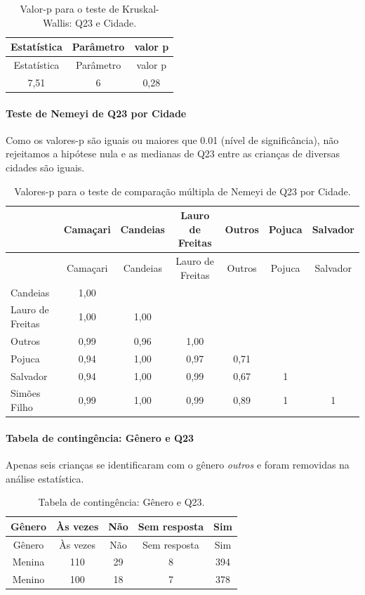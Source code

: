 \documentclass[]{article}
\let\oldparagraph\paragraph
\renewcommand{\paragraph}[1]{\oldparagraph{#1}\mbox{}}
\begin{document}
\begin{longtable}[]{@{}ccc@{}}
\caption{\label{tab:unnamed-chunk-550}Valor-p para o teste de Kruskal-Wallis: Q23 e Cidade.}\tabularnewline
\toprule
Estatística & Parâmetro & valor p\tabularnewline
\midrule
\endfirsthead
\toprule
Estatística & Parâmetro & valor p\tabularnewline
\midrule
\endhead
7,51 & 6 & 0,28\tabularnewline
\bottomrule
\end{longtable}

\hypertarget{teste-de-nemeyi-de-q23-por-cidade}{%
\paragraph{Teste de Nemeyi de Q23 por Cidade}\label{teste-de-nemeyi-de-q23-por-cidade}}

Como os valores-p são iguais ou maiores que 0.01 (nível de significância), não rejeitamos a hipótese nula e as medianas de Q23 entre as crianças de diversas cidades são iguais.

\begin{longtable}[]{@{}lcccccc@{}}
\caption{\label{tab:unnamed-chunk-552}Valores-p para o teste de comparação múltipla de Nemeyi de Q23 por Cidade.}\tabularnewline
\toprule
& Camaçari & Candeias & Lauro de Freitas & Outros & Pojuca & Salvador\tabularnewline
\midrule
\endfirsthead
\toprule
& Camaçari & Candeias & Lauro de Freitas & Outros & Pojuca & Salvador\tabularnewline
\midrule
\endhead
Candeias & 1,00 & & & & &\tabularnewline
Lauro de Freitas & 1,00 & 1,00 & & & &\tabularnewline
Outros & 0,99 & 0,96 & 1,00 & & &\tabularnewline
Pojuca & 0,94 & 1,00 & 0,97 & 0,71 & &\tabularnewline
Salvador & 0,94 & 1,00 & 0,99 & 0,67 & 1 &\tabularnewline
Simões Filho & 0,99 & 1,00 & 0,99 & 0,89 & 1 & 1\tabularnewline
\bottomrule
\end{longtable}

\cleardoublepage

\hypertarget{tabela-de-continguxeancia-guxeanero-e-q23}{%
\paragraph{Tabela de contingência: Gênero e Q23}\label{tabela-de-continguxeancia-guxeanero-e-q23}}

Apenas seis crianças se identificaram com o gênero \emph{outros} e foram removidas na análise estatística.

\begin{longtable}[]{@{}ccccc@{}}
\caption{\label{tab:unnamed-chunk-553}Tabela de contingência: Gênero e Q23.}\tabularnewline
\toprule
Gênero & Às vezes & Não & Sem resposta & Sim\tabularnewline
\midrule
\endfirsthead
\toprule
Gênero & Às vezes & Não & Sem resposta & Sim\tabularnewline
\midrule
\endhead
Menina & 110 & 29 & 8 & 394\tabularnewline
Menino & 100 & 18 & 7 & 378\tabularnewline
\bottomrule
\end{longtable}
\end{document}
